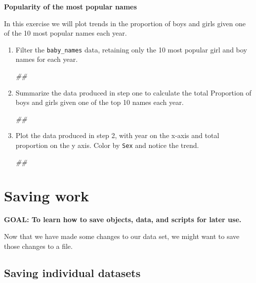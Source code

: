 \documentclass[
]{book}
\newenvironment{Shaded}{\begin{snugshade}}{\end{snugshade}}
\newcommand{\CommentTok}[1]{\textcolor[rgb]{0.56,0.35,0.01}{\textit{#1}}}
\begin{document}
\textbf{Popularity of the most popular names}

In this exercise we will plot trends in the proportion of boys and girls
given one of the 10 most popular names each year.

\begin{enumerate}
\def\labelenumi{\arabic{enumi}.}
\item
  Filter the \texttt{baby\_names} data, retaining only the 10 most popular girl
  and boy names for each year.

\begin{Shaded}
\begin{Highlighting}[]
\CommentTok{##}
\end{Highlighting}
\end{Shaded}
\item
  Summarize the data produced in step one to calculate the total
  Proportion of boys and girls given one of the top 10 names
  each year.

\begin{Shaded}
\begin{Highlighting}[]
\CommentTok{##}
\end{Highlighting}
\end{Shaded}
\item
  Plot the data produced in step 2, with year on the x-axis
  and total proportion on the y axis. Color by \texttt{Sex} and notice
  the trend.

\begin{Shaded}
\begin{Highlighting}[]
\CommentTok{##}
\end{Highlighting}
\end{Shaded}
\end{enumerate}

\hypertarget{saving-work}{%
\section{Saving work}\label{saving-work}}

\textbf{GOAL: To learn how to save objects, data, and scripts for later use.}

Now that we have made some changes to our data set, we might want to
save those changes to a file.

\hypertarget{saving-individual-datasets}{%
\subsection{Saving individual datasets}\label{saving-individual-datasets}}
\end{document}

